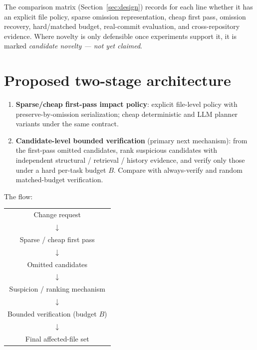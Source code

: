 \documentclass[11pt,a4paper]{article}
\begin{document}
The comparison matrix (Section~\ref{sec:design}) records for each line whether
it has an explicit file policy, sparse omission representation, cheap first
pass, omission recovery, hard/matched budget, real-commit evaluation, and
cross-repository evidence. Where novelty is only defensible once experiments
support it, it is marked \emph{candidate novelty --- not yet claimed}.

\section{Proposed two-stage architecture}
\label{sec:architecture}

\begin{enumerate}
  \item \textbf{Sparse/cheap first-pass impact policy}: explicit file-level
        policy with preserve-by-omission serialization; cheap deterministic and
        LLM planner variants under the same contract.
  \item \textbf{Candidate-level bounded verification} (primary next mechanism):
        from the first-pass omitted candidates, rank suspicious candidates with
        independent structural / retrieval / history evidence, and verify only
        those under a hard per-task budget $B$. Compare with always-verify and
        random matched-budget verification.
\end{enumerate}

The flow:

\begin{center}
\begin{tabular}{@{}c@{}}
\hline
Change request \\
$\downarrow$ \\
Sparse / cheap first pass \\
$\downarrow$ \\
Omitted candidates \\
$\downarrow$ \\
Suspicion / ranking mechanism \\
$\downarrow$ \\
Bounded verification (budget $B$) \\
$\downarrow$ \\
Final affected-file set \\
\hline
\end{tabular}
\end{center}

\end{document}
